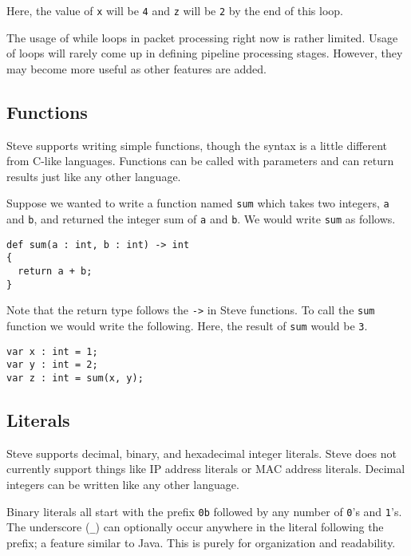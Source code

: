Here, the value of \texttt{x} will be \texttt{4} and \texttt{z} will be \texttt{2} by the end of this loop.

The usage of while loops in packet processing right now is rather limited. Usage of loops will rarely come up in defining pipeline processing stages. However, they may become more useful as other features are added.

\subsection{Functions} \label{tut:function}

Steve supports writing simple functions, though the syntax is a little different from C-like languages. Functions can be called with parameters and can return results just like any other language. 

Suppose we wanted to write a function named \texttt{sum} which takes two integers, \texttt{a} and \texttt{b}, and returned the integer sum of \texttt{a} and \texttt{b}. We would write \texttt{sum} as follows.

\begin{codepage}
\begin{lstlisting}
def sum(a : int, b : int) -> int
{
  return a + b;
}
\end{lstlisting}
\end{codepage}

Note that the return type follows the \texttt{->} in Steve functions. To call the \texttt{sum} function we would write the following. Here, the result of \texttt{sum} would be \texttt{3}.

\begin{codepage}
\begin{lstlisting}
var x : int = 1;
var y : int = 2;
var z : int = sum(x, y);
\end{lstlisting}
\end{codepage}

\subsection{Literals} \label{tut:literal}

Steve supports decimal, binary, and hexadecimal integer literals. Steve does not currently support things like IP address literals or MAC address literals. Decimal integers can be written like any other language.

Binary literals all start with the prefix \texttt{0b} followed by any number of \texttt{0}'s and \texttt{1}'s. The underscore (\texttt{\_}) can optionally occur anywhere in the literal following the prefix; a feature similar to Java. This is purely for organization and readability.

